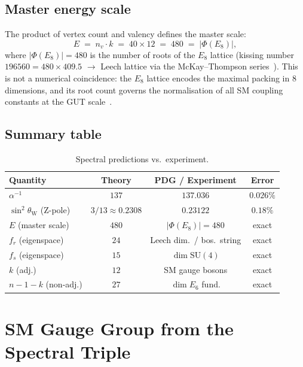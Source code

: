 \documentclass[aps,prl,twocolumn,showpacs,preprintnumbers,amsmath,amssymb]{revtex4-2}
\newcommand{\Eeight}{E_8}
\newcommand{\nv}{n_{\!v}}
\newcommand{\alphafs}{\alpha^{-1}}
\newcommand{\sinW}{\sin^2\!\theta_{\mathrm{W}}}
\begin{document}
\subsection{Master energy scale}

The product of vertex count and valency defines the master scale:
\begin{equation}
  E \;=\; \nv \cdot k \;=\; 40 \times 12 \;=\; 480 \;=\; |\Phi(\Eeight)|,
  \label{eq:master_scale}
\end{equation}
where $|\Phi(\Eeight)| = 480$ is the number of roots of the $\Eeight$
lattice (kissing number $196560 = 480 \times 409.5$
$\to$ Leech lattice via the McKay--Thompson
series~\cite{Conway1979,Monstrous1979}).  This is not a numerical
coincidence: the $\Eeight$ lattice encodes the maximal packing in
8 dimensions, and its root count governs the
normalisation of all SM coupling constants at the GUT
scale~\cite{Georgi1974}.

\subsection{Summary table}

\begin{table}[h]
\centering
\caption{Spectral predictions vs.~experiment.}
\label{tab:results}
\begin{tabular}{lccc}
\toprule
Quantity & Theory & PDG / Experiment & Error \\
\midrule
$\alphafs$           & $137$          & $137.036$         & $0.026\%$ \\
$\sinW$ (Z-pole) & $3/13\approx0.2308$ & $0.23122$ & $0.18\%$ \\
$E$ (master scale)  & $480$          & $|\Phi(E_8)|=480$ & exact \\
$f_r$ (eigenspace) & $24$ & Leech dim.~/ bos.~string & exact \\
$f_s$ (eigenspace) & $15$ & $\dim\mathrm{SU}(4)$ & exact \\
$k$ (adj.) & $12$ & SM gauge bosons & exact \\
$n{-}1{-}k$ (non-adj.) & $27$ & $\dim E_6$ fund. & exact \\
\bottomrule
\end{tabular}
\end{table}

\section{SM Gauge Group from the Spectral Triple}
\label{sec:gauge}
\end{document}
